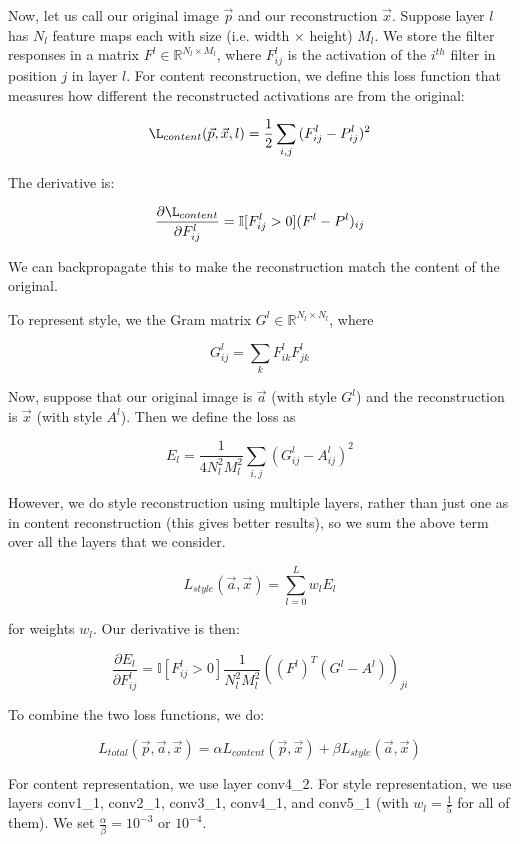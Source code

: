\documentclass[a4paper]{article}
\begin{document}
Now, let us call our original image $\vec{p}$ and our reconstruction $\vec{x}$.
Suppose layer $l$ has $N_l$ feature maps each with size (i.e. width $\times$
height) $M_l$. We store the filter responses in a matrix $F^l \in \mathbb{R}^{
N_l \times M_l}$, where $F^l_{ij}$ is the activation of the $i^{th}$ filter in
position $j$ in layer $l$. For content reconstruction, we define this
loss function that measures how different the reconstructed activations are
from the original:

$$
\L_{content}(\vec{p}, \vec{x}, l) = \frac{1}{2} \sum_{i,j}{
(F^l_{ij} - P^l_{ij})^2
}
$$

The derivative is:

$$
\frac{\partial \L_{content}}{\partial F^l_{ij}} = \mathbb{I}[F^l_{ij} > 0]
(F^l - P^l)_{ij}
$$

We can backpropagate this to make the reconstruction match the content of the
original.

To represent style, we the Gram matrix $G^l \in \mathbb{R}^{N_l \times N_l}$,
where

$$
G^l_{ij} = \sum_{k}{F^l_{ik} F^l_{jk}}
$$

Now, suppose that our original image is $\vec{a}$ (with style $G^l$) and the
reconstruction is $\vec{x}$ (with style $A^l$). Then we define the loss
as

$$
E_l = \frac{1}{4 N_l^2 M_l^2} \sum_{i, j}{(G^l_{ij} - A^l_{ij})^2}
$$

However, we do style reconstruction using multiple layers, rather than just one
as in content reconstruction (this gives better results), so we sum the
above term over all the layers that we consider.

$$
L_{style}(\vec{a}, \vec{x}) = \sum_{l=0}^{L} w_l E_l
$$

for weights $w_l$. Our derivative is then:

$$
\frac{\partial E_l}{\partial F^l_{ij}} = \mathbb{I}[F^l_{ij} > 0] \frac{1}{
N_l^2 M_l^2}((F^l)^T(G^l - A^l))_{ji}
$$

To combine the two loss functions, we do:

$$
L_{total}(\vec{p}, \vec{a}, \vec{x}) = \alpha L_{content}(\vec{p}, \vec{x})
+ \beta L_{style}(\vec{a}, \vec{x})
$$

For content representation, we use layer conv4\_2. For style representation,
we use layers conv1\_1, conv2\_1, conv3\_1, conv4\_1, and conv5\_1 (with $w_l
= \frac{1}{5}$ for all of them). We set $\frac{\alpha}{\beta} = 10^{-3}$ or
$10^{-4}$.
\end{document}

